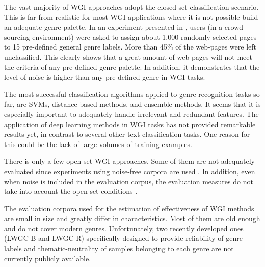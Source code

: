 The vast majority of WGI approaches adopt the closed-set classification scenario. This is far from realistic for most WGI applications where it is not possible build an adequate genre palette. In an experiment presented in \parencite{Asheghi2015}, users (in a crowd-sourcing environment) were asked to assign about 1,000 randomly selected pages to 15 pre-defined general genre labels. More than 45\% of the web-pages were left unclassified. This clearly shows that a great amount of web-pages will not meet the criteria of any pre-defined genre palette. In addition, it demonstrates that the level of noise is higher than any pre-defined genre in WGI tasks. 

The most successful classification algorithms applied to genre recognition tasks so far, are SVMs, distance-based methods, and ensemble methods. It seems that it is especially important to adequately handle irrelevant and redundant features. The application of deep learning methods in WGI tasks has not provided remarkable results yet, in contrast to several other text classification tasks. One reason for this could be the lack of large volumes of training examples. 

There is only a few open-set WGI approaches. Some of them are not adequately evaluated since experiments using noise-free corpora are used \parencite{stubbe2007genre,jebari2015combination}. In addition, even when noise is included in the evaluation corpus, the evaluation measures do not take into account the open-set conditions \parencite{Asheghi2015}. 

The evaluation corpora used for the estimation of effectiveness of WGI methods are small in size and greatly differ in characteristics. Most of them are old enough and do not cover modern genres. Unfortunately, two recently developed ones (LWGC-B and LWGC-R) specifically designed to provide reliability of genre labels and thematic-neutrality of samples belonging to each genre are not currently publicly available. 


